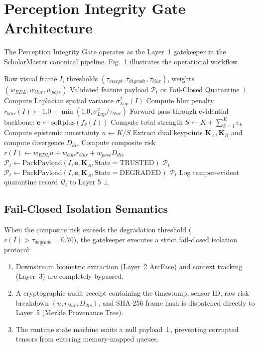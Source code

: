 \documentclass[10pt,journal,compsoc]{IEEEtran}
\begin{document}
\section{Perception Integrity Gate Architecture}
The Perception Integrity Gate operates as the Layer~1 gatekeeper in the ScholarMaster canonical pipeline. Fig.~1 illustrates the operational workflow.

\begin{algorithm}[t]
\caption{Evidential Perception Integrity Gatekeeper (Layer 1)}
\label{alg:perception_gate}
\begin{algorithmic}[1]
\REQUIRE Raw visual frame $I$, thresholds $(\tau_{accept}, \tau_{degrade}, \tau_{blur})$, weights $(w_{EDL}, w_{blur}, w_{pose})$
\ENSURE Validated feature payload $\mathcal{P}_t$ or Fail-Closed Quarantine $\bot$
\STATE Compute Laplacian spatial variance $\sigma_{Lap}^2(I)$
\STATE Compute blur penalty $r_{blur}(I) \leftarrow 1.0 - \min(1.0, \sigma_{Lap}^2 / \tau_{blur})$
\STATE Forward pass through evidential backbone: $\mathbf{e} \leftarrow \text{softplus}(f_\theta(I))$
\STATE Compute total strength $S \leftarrow K + \sum_{k=1}^K e_k$
\STATE Compute epistemic uncertainty $u \leftarrow K / S$
\STATE Extract dual keypoints $\mathbf{K}_A, \mathbf{K}_B$ and compute divergence $D_{dis}$
\STATE Compute composite risk $r(I) \leftarrow w_{EDL} u + w_{blur} r_{blur} + w_{pose} D_{dis}$
    \STATE $\mathcal{P}_t \leftarrow \text{PackPayload}(I, \mathbf{e}, \mathbf{K}_A, \text{State}=\text{TRUSTED})$
    \RETURN $\mathcal{P}_t$
    \STATE $\mathcal{P}_t \leftarrow \text{PackPayload}(I, \mathbf{e}, \mathbf{K}_A, \text{State}=\text{DEGRADED})$
    \RETURN $\mathcal{P}_t$
\ELSE
    \STATE Log tamper-evident quarantine record $\mathcal{Q}_t$ to Layer 5
    \RETURN $\bot$ 
\ENDIF
\end{algorithmic}
\end{algorithm}

\subsection{Fail-Closed Isolation Semantics}
When the composite risk exceeds the degradation threshold ($r(I) > \tau_{degrade} = 0.70$), the gatekeeper executes a strict fail-closed isolation protocol:
\begin{enumerate}
    \item Downstream biometric extraction (Layer~2 ArcFace) and context tracking (Layer~3) are completely bypassed.
    \item A cryptographic audit receipt containing the timestamp, sensor ID, raw risk breakdown $(u, r_{blur}, D_{dis})$, and SHA-256 frame hash is dispatched directly to Layer~5 (Merkle Provenance Tree).
    \item The runtime state machine emits a null payload $\bot$, preventing corrupted tensors from entering memory-mapped queues.
\end{enumerate}
\end{document}
